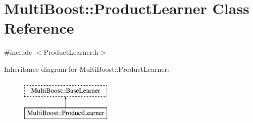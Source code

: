 \hypertarget{classMultiBoost_1_1ProductLearner}{
\section{MultiBoost::ProductLearner Class Reference}
\label{classMultiBoost_1_1ProductLearner}
}


{\ttfamily \#include $<$ProductLearner.h$>$}

Inheritance diagram for MultiBoost::ProductLearner:\begin{figure}[H]
\begin{center}
\leavevmode
\includegraphics[height=2.000000cm]{classMultiBoost_1_1ProductLearner}
\end{center}
\end{figure}

